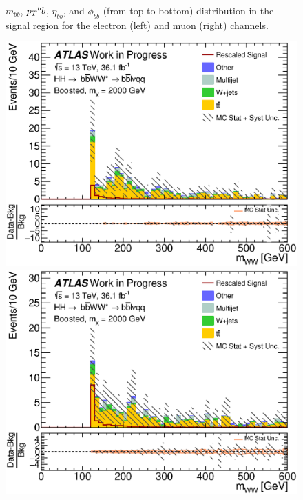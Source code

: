 \begin{figure}[h]
\begin{center}
\caption[Kinematic distributions in the signal region for the electron and muon channels]{$m_{bb}$, $\pt^bb$,  $\eta_{bb}$, and $\phi_{bb}$ (from top to bottom) distribution in the signal region for the electron (left) and muon (right) channels.}
\end{center}
\end{figure}

\newpage

\begin{figure}[h]
\begin{center}
\includegraphics[scale=0.33]{figures/kinplots/C_2tag_SR_elec_presel_met50_WWMass}
\includegraphics[scale=0.33]{figures/kinplots/C_2tag_SR_muon_presel_met50_WWMass}\\

\end{center}
\end{figure}

